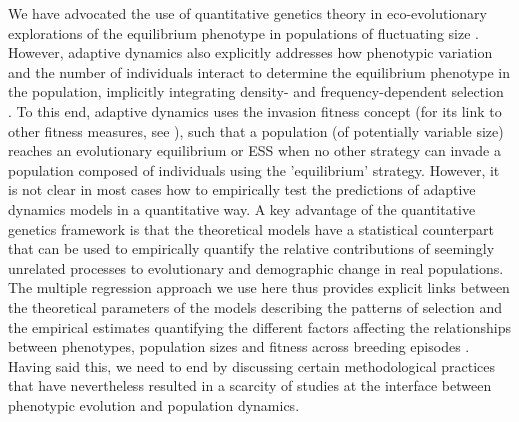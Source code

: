 \documentclass{article}
\begin{document}
We have advocated the use of quantitative genetics theory in eco-evolutionary explorations of the equilibrium phenotype in populations of fluctuating size \citep{Engen2013, Engen2020, Lande2017, Lande2009a}. However, adaptive dynamics also explicitly addresses how phenotypic variation and the number of individuals interact to determine the equilibrium phenotype in the population, implicitly integrating density- and frequency-dependent selection \citep{McGill2007}. To this end, adaptive dynamics uses the invasion fitness concept (for its link to other fitness measures, see \cite{Lehmann2016}), such that a population (of potentially variable size) reaches an evolutionary equilibrium or ESS when no other strategy can invade a population composed of individuals using the 'equilibrium' strategy. However, it is not clear in most cases how to empirically test the predictions of adaptive dynamics models in a quantitative way. A key advantage of the quantitative genetics framework is that the theoretical models have a statistical counterpart that can be used to empirically quantify the relative contributions of seemingly unrelated processes to evolutionary and demographic change in real populations. The multiple regression approach we use here thus provides explicit links between the theoretical parameters of the models describing the patterns of selection and the empirical estimates quantifying the different factors affecting the relationships between phenotypes, population sizes and fitness across breeding episodes \citep{Lande1983, Queller1992b, Wolf1999SocialSelection, Heisler1987, Goodnight1992}. Having said this, we need to end by discussing certain methodological practices that have nevertheless resulted in a scarcity of studies at the interface between phenotypic evolution and population dynamics.
\end{document}

